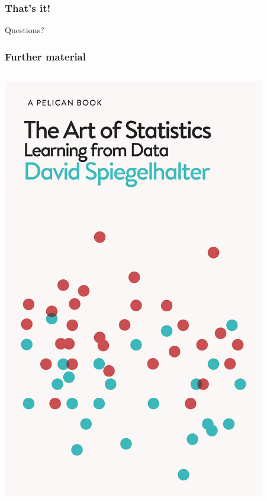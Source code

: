 \documentclass[handout]{beamer}
\begin{document}
\begin{frame}
	\frametitle{That's it!}
	
	\Large Questions?
\end{frame}

\begin{frame}
	\frametitle{Further material}
	
	\begin{columns}
		\begin{column}{0.3\textwidth}
			\includegraphics[width=0.9\textwidth]{../figures/art_of_statistics.jpeg}
		\end{column}
		\begin{column}{0.3\textwidth}

\end{column}
\end{columns}
\end{frame}
\end{document}
